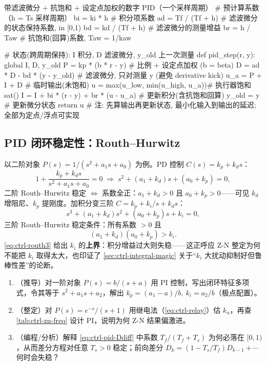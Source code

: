 \begin{codebox}[Python]{带滤波微分 + 抗饱和 + 设定点加权的数字 PID（一个采样周期）}
# 预计算系数（h = Ts 采样周期）
bi = ki * h                 # 积分项系数
ad = Tf / (Tf + h)          # 滤波微分的状态保持系数, in [0,1)
bd = kd / (Tf + h)          # 滤波微分的测量增益
br = h / Taw                # 抗饱和(回算)系数, Taw = 1/kaw

# 状态(跨周期保持): I 积分, D 滤波微分, y_old 上一次测量
def pid_step(r, y):
    global I, D, y_old
    P  = kp * (b * r - y)            # 比例 + 设定点加权 (b = beta)
    D  = ad * D - bd * (y - y_old)   # 滤波微分, 只对测量 y (避免 derivative kick)
    u_a = P + I + D                  # 临时输出(未饱和)
    u  = max(u_low, min(u_high, u_a))# 执行器饱和 sat()
    I  = I + bi * (r - y) + br * (u - u_a)  # 更新积分(含抗饱和回算)
    y_old = y                        # 更新微分状态
    return u
# 注: 先算输出再更新状态, 最小化输入到输出的延迟; 全部为定点/浮点可实现
\end{codebox}

\subsection{PID 闭环稳定性：Routh--Hurwitz}
\label{sec:ctrl-pid-routh}

以二阶对象 $P(s)=1/(s^2+a_1s+a_0)$ 为例。PD 控制 $C(s)=k_p+k_ds$：
\begin{equation}
  1+\frac{k_p+k_ds}{s^2+a_1s+a_0}=0\;\Rightarrow\;s^2+(a_1+k_d)s+(a_0+k_p)=0,
\end{equation}
二阶 Routh--Hurwitz 稳定 $\iff$ 系数全正：$a_1+k_d>0$ 且 $a_0+k_p>0$——可见 $k_d$ 增阻尼、$k_p$ 提刚度。加积分变三阶 $C=k_p+k_i/s+k_ds$：
\begin{equation}
  s^3+(a_1+k_d)s^2+(a_0+k_p)s+k_i=0,
\end{equation}
三阶 Routh--Hurwitz 稳定条件：所有系数 $>0$ 且
\begin{equation}
  (a_1+k_d)(a_0+k_p)>k_i.
  \label{eq:ctrl-routh3}
\end{equation}
\cref{eq:ctrl-routh3} 给出 $k_i$ 的\textbf{上界}：积分增益过大则失稳——这正呼应 Z-N 整定为何不能把 $k_i$ 取得太大，也印证了 \cref{sec:ctrl-integral-magic} 关于“$k_i$ 大扰动抑制好但鲁棒性差”的论断。

\begin{practice}
\begin{enumerate}
  \item （推导）对一阶对象 $P(s)=b/(s+a)$ 用 PI 控制，写出闭环特征多项式，令其等于 $s^2+a_1s+a_2$，解出 $k_p=(a_1-a)/b,\ k_i=a_2/b$（极点配置）。
  \item （整定）对 $P(s)=e^{-s}/(s+1)$ 用继电法（\cref{eq:ctrl-relay}）估 $k_u$，再查 \cref{tab:ctrl-zn-freq} 设计 PI，说明为何 Z-N 结果偏激进。
  \item （编程/分析）解释 \cref{eq:ctrl-pid-Ddiff} 中系数 $T_f/(T_f+T_s)$ 为何必落在 $[0,1)$，从而差分方程对任意 $T_s>0$ 稳定；前向差分 $D_k=(1-T_s/T_f)D_{k-1}+\cdots$ 何时会失稳？
\end{enumerate}
\end{practice}


